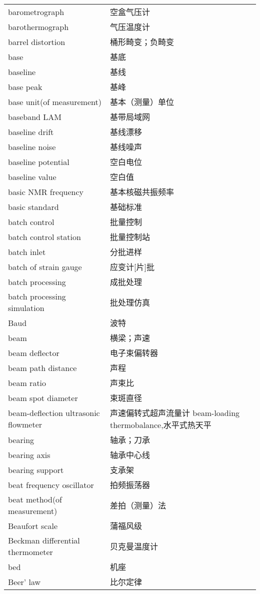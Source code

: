 \documentclass[
]{article}
\begin{document}
\begin{longtable}[]{@{}ll@{}}
barometrograph & 空盒气压计 \\
barothermograph & 气压温度计 \\
barrel distortion & 桶形畸变；负畸变 \\
base & 基底 \\
baseline & 基线 \\
base peak & 基峰 \\
base unit(of measurement) & 基本（测量）单位 \\
baseband LAM & 基带局域网 \\
baseline drift & 基线漂移 \\
baseline noise & 基线噪声 \\
baseline potential & 空白电位 \\
baseline value & 空白值 \\
basic NMR frequency & 基本核磁共振频率 \\
basic standard & 基础标准 \\
batch control & 批量控制 \\
batch control station & 批量控制站 \\
batch inlet & 分批进样 \\
batch of strain gauge & 应变计{[}片{]}批 \\
batch processing & 成批处理 \\
batch processing simulation & 批处理仿真 \\
Baud & 波特 \\
beam & 横梁；声速 \\
beam deflector & 电子束偏转器 \\
beam path distance & 声程 \\
beam ratio & 声束比 \\
beam spot diameter & 束斑直径 \\
beam-deflection ultrasonic flowmeter & 声速偏转式超声流量计 beam-loading
thermobalance,水平式热天平 \\
bearing & 轴承；刀承 \\
bearing axis & 轴承中心线 \\
bearing support & 支承架 \\
beat frequency oscillator & 拍频振荡器 \\
beat method(of measurement) & 差拍（测量）法 \\
Beaufort scale & 蒲福风级 \\
Beckman differential thermometer & 贝克曼温度计 \\
bed & 机座 \\
Beer' law & 比尔定律 \\

\end{longtable}
\end{document}
